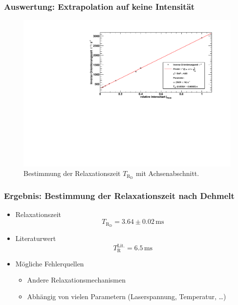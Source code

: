 \begin{frame}
\frametitle{Auswertung: Extrapolation auf keine Intensität}
\begin{figure}
    \begin{center}
        \includegraphics[width=\textwidth]{../img/taufit.pdf}
        \caption{Bestimmung der Relaxationszeit $T_{\text{R}_\text{D}}$ mit Achsenabschnitt.}
    \end{center}
\end{figure}
\end{frame}

\begin{frame}
\frametitle{Ergebnis: Bestimmung der Relaxationszeit nach Dehmelt}
\begin{itemize}[<+->]
    \item Relaxationszeit
    \begin{equation*}
        T_{\text{R}_\text{D}} = 3.64 \pm 0.02\,\text{ms}
    \end{equation*}
    \item Literaturwert
    \begin{equation*}
        T_{\text{R}}^\text{Lit.} = 6.5\,\text{ms}
    \end{equation*}
    \item Mögliche Fehlerquellen
    \begin{itemize}[<+->]
        \item Andere Relaxationsmechanismen
        \item Abhängig von vielen Parametern (Laserspannung, Temperatur, \ldots)
    \end{itemize}
\end{itemize}
\end{frame}